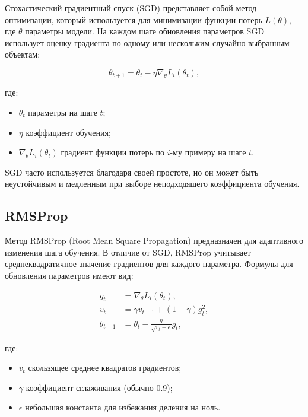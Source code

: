 Стохастический градиентный спуск (SGD) представляет собой метод оптимизации, который используется для минимизации функции потерь $L(\theta)$, где $\theta$ \textendash{} параметры модели. На каждом шаге обновления параметров SGD использует оценку градиента по одному или нескольким случайно выбранным объектам:

\begin{equation}
\theta_{t+1} = \theta_t - \eta \nabla_\theta L_i(\theta_t),
\end{equation}

где:
\begin{itemize}
    \item $\theta_t$ \textendash{} параметры на шаге $t$;
    \item $\eta$ \textendash{} коэффициент обучения;
    \item $\nabla_\theta L_i(\theta_t)$ \textendash{} градиент функции потерь по $i$-му примеру на шаге $t$.
\end{itemize}

SGD часто используется благодаря своей простоте, но он может быть неустойчивым и медленным при выборе неподходящего коэффициента обучения.

\subsection{RMSProp}

Метод RMSProp (Root Mean Square Propagation) предназначен для адаптивного изменения шага обучения. В отличие от SGD, RMSProp учитывает среднеквадратичное значение градиентов для каждого параметра. Формулы для обновления параметров имеют вид:

\begin{align}
    g_t &= \nabla_\theta L_i(\theta_t), \\
    v_t &= \gamma v_{t-1} + (1 - \gamma) g_t^2, \\
    \theta_{t+1} &= \theta_t - \frac{\eta}{\sqrt{v_t + \epsilon}} g_t,
\end{align}

где:
\begin{itemize}
    \item $v_t$ \textendash{} скользящее среднее квадратов градиентов;
    \item $\gamma$ \textendash{} коэффициент сглаживания (обычно $0.9$);
    \item $\epsilon$ \textendash{} небольшая константа для избежания деления на ноль.
\end{itemize}

